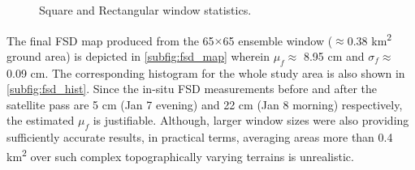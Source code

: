\documentclass{article}
\begin{document}
\begin{figure}[htb]
    \centering
    \begin{subfigure}[t]{0.49\columnwidth}
        \caption{}
        \label{subfig:graph_sq}
    \end{subfigure}
    \hfill
    \begin{subfigure}[t]{0.49\columnwidth}
        \caption{}
        \label{subfig:graph_rect}
    \end{subfigure}
    \vspace{-2ex}
    \caption{\textbf{} Square and \textbf{} Rectangular window statistics.}
    \label{fig:graph_window}
\end{figure}

The final FSD map produced from the 65$\times$65 ensemble window ($\approx$0.38 km\textsuperscript{2} ground area) is depicted in \ref{subfig:fsd_map} wherein $\mu_f \approx$ 8.95 cm and $\sigma_f \approx$ 0.09 cm. The corresponding histogram for the whole study area is also shown in \ref{subfig:fsd_hist}. Since the in-situ FSD measurements before and after the satellite pass are 5 cm (Jan 7 evening) and 22 cm (Jan 8 morning) respectively, the estimated $\mu_f$ is justifiable. Although, larger window sizes were also providing sufficiently accurate results, in practical terms, averaging areas more than 0.4 km\textsuperscript{2} over such complex topographically varying terrains is unrealistic.
\end{document}
